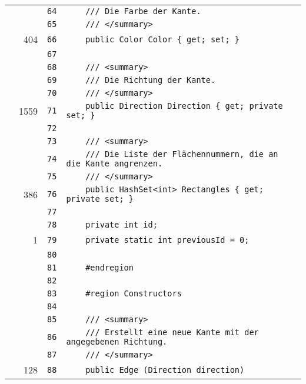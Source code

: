 \documentclass[a4paper,10pt]{article}
\begin{document}
\begin{longtable}[l]{lrrl}
\cellcolor{gray} &  & \verb~64~ & \verb~    /// Die Farbe der Kante.~\\
\cellcolor{gray} &  & \verb~65~ & \verb~    /// </summary>~\\
\cellcolor{green} & 404 & \verb~66~ & \verb~    public Color Color { get; set; }~\\
\cellcolor{gray} &  & \verb~67~ & \verb~~\\
\cellcolor{gray} &  & \verb~68~ & \verb~    /// <summary>~\\
\cellcolor{gray} &  & \verb~69~ & \verb~    /// Die Richtung der Kante.~\\
\cellcolor{gray} &  & \verb~70~ & \verb~    /// </summary>~\\
\cellcolor{green} & 1559 & \verb~71~ & \verb~    public Direction Direction { get; private set; }~\\
\cellcolor{gray} &  & \verb~72~ & \verb~~\\
\cellcolor{gray} &  & \verb~73~ & \verb~    /// <summary>~\\
\cellcolor{gray} &  & \verb~74~ & \verb~    /// Die Liste der Flächennummern, die an die Kante angrenzen.~\\
\cellcolor{gray} &  & \verb~75~ & \verb~    /// </summary>~\\
\cellcolor{green} & 386 & \verb~76~ & \verb~    public HashSet<int> Rectangles { get; private set; }~\\
\cellcolor{gray} &  & \verb~77~ & \verb~~\\
\cellcolor{gray} &  & \verb~78~ & \verb~    private int id;~\\
\cellcolor{green} & 1 & \verb~79~ & \verb~    private static int previousId = 0;~\\
\cellcolor{gray} &  & \verb~80~ & \verb~~\\
\cellcolor{gray} &  & \verb~81~ & \verb~    #endregion~\\
\cellcolor{gray} &  & \verb~82~ & \verb~~\\
\cellcolor{gray} &  & \verb~83~ & \verb~    #region Constructors~\\
\cellcolor{gray} &  & \verb~84~ & \verb~~\\
\cellcolor{gray} &  & \verb~85~ & \verb~    /// <summary>~\\
\cellcolor{gray} &  & \verb~86~ & \verb~    /// Erstellt eine neue Kante mit der angegebenen Richtung.~\\
\cellcolor{gray} &  & \verb~87~ & \verb~    /// </summary>~\\
\cellcolor{green} & 128 & \verb~88~ & \verb~    public Edge (Direction direction)~\\

\end{longtable}
\end{document}
